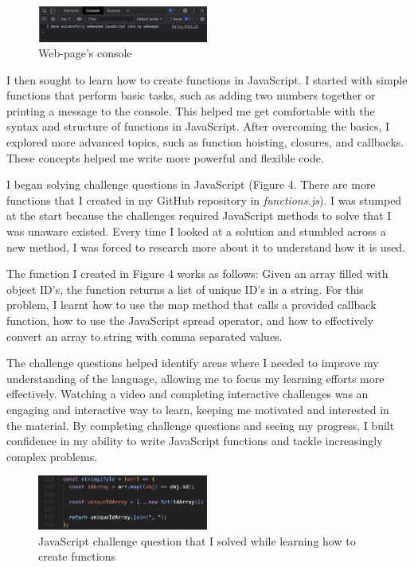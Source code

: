 \documentclass[a4paper, 11pt]{report}
\begin{document}
\begin{figure}[ht]
    \centering
    \includegraphics[width=0.5\textwidth]{Images/embedding3.png}
    \caption{Web-page's console}
    \label{fig:screenshot}
\end{figure}

I then sought to learn how to create functions in JavaScript. I started with simple functions that perform basic tasks, such as adding two numbers together or printing a message to the console. This helped me get comfortable with the syntax and structure of functions in JavaScript. After overcoming the basics, I explored more advanced topics, such as function hoisting, closures, and callbacks. These concepts helped me write more powerful and flexible code.

I began solving challenge questions in JavaScript (Figure 4. There are more functions that I created in my GitHub repository in \emph{functions.js}). I was stumped at the start because the challenges required JavaScript methods to solve that I was unaware existed. Every time I looked at a solution and stumbled across a new method, I was forced to research more about it to understand how it is used. 

The function I created in Figure 4 works as follows: Given an array filled with object ID's, the function returns a list of unique ID's in a string. For this problem, I learnt how to use the map method that calls a provided callback function, how to use the JavaScript spread operator, and how to effectively convert an array to string with comma separated values.

The challenge questions helped identify areas where I needed to improve my understanding of the language, allowing me to focus my learning efforts more effectively. Watching a video and completing interactive challenges was an engaging and interactive way to learn, keeping me motivated and interested in the material. By completing challenge questions and seeing my progress, I built confidence in my ability to write JavaScript functions and tackle increasingly complex problems.

\begin{figure}[ht]
    \centering
    \includegraphics[width=0.5\textwidth]{Images/functions.png}
    \caption{JavaScript challenge question that I solved while learning how to create functions}
    \label{fig:screenshot}
\end{figure}
\end{document}
